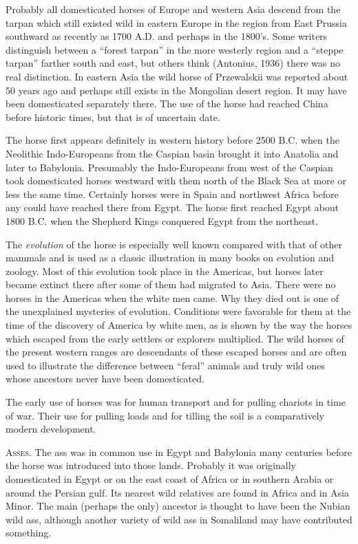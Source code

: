 Probably all domesticated horses of Europe and western Asia descend from the tarpan which still existed wild in
eastern Europe in the region from East Prussia southward as recently as 1700 A.D. and perhaps in the 1800's.
Some writers distinguish between a ``forest tarpan'' in the more westerly region and a ``steppe tarpan'' farther
south and east, but others think (Antonius, 1936) there was no real distinction. In eastern Asia the wild horse
of Przewalskii was reported about 50 years ago and perhaps still exists in the Mongolian desert region. It may
have been domesticated separately there. The use of the horse had reached China before historic times, but that
is of uncertain date.

The horse first appears definitely in western history before 2500 B.C. when the Neolithic Indo-Europeans from
the Caspian basin brought it into Anatolia and later to Babylonia. Presumably the Indo-Europeans from west of
the Caspian took domesticated horses westward with them north of the Black Sea at more or less the same time.
Certainly horses were in Spain and northwest Africa before any could have reached there from Egypt. The horse
first reached Egypt about 1800 B.C. when the Shepherd Kings conquered Egypt from the northeast.

The \textit{evolution} of the horse is especially well known compared with that of other mammals and is used
as a classic illustration in many books on evolution and zoology. Most of this evolution took place in the
Americas, but horses later became extinct there after some of them had migrated to Asia. There were no horses
in the Americas when the white men came. Why they died out is one of the unexplained mysteries of evolution.
Conditions were favorable for them at the time of the discovery of America by white men, as is shown by the way
the horses which escaped from the early settlers or explorers multiplied. The wild horses of the present western
ranges are descendants of these escaped horses and are often used to illustrate the difference between ``feral''
animals and truly wild ones whose ancestors never have been domesticated.

The early use of horses was for human transport and for pulling chariots in time of war. Their use for pulling
loads and for tilling the soil is a comparatively modern development.

\textsc{Asses}. The ass was in common use in Egypt and Babylonia many centuries before the horse was introduced
into those lands. Probably it was originally domesticated in Egypt or on the east coast of Africa or in southern
Arabia or around the Persian gulf. Its nearest wild relatives are found in Africa and in Asia Minor. The main
(perhaps the only) ancestor is thought to have been the Nubian wild ass, although another variety of wild ass in
Somaliland may have contributed something.

